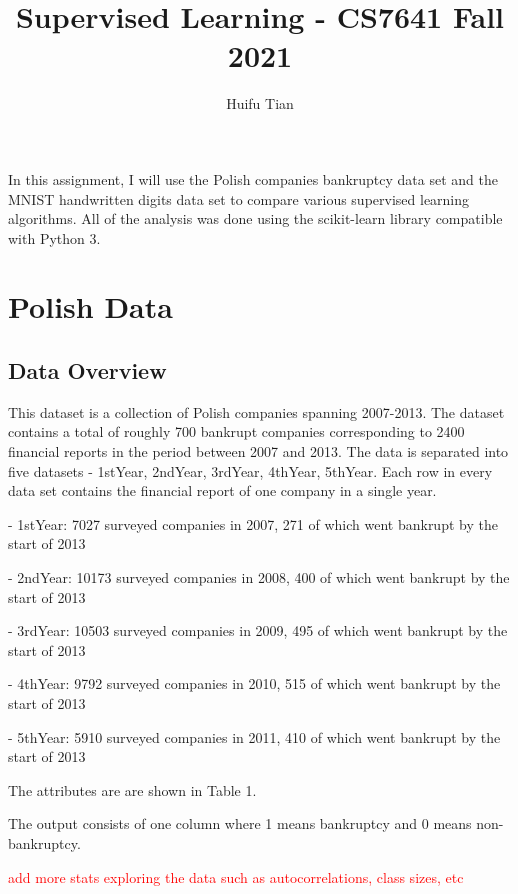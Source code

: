 \documentclass{article}
\title{Supervised Learning - CS7641 Fall 2021}
\author{Huifu Tian}
\newcommand\todo[1]{\textcolor{red}{#1}}
\begin{document}
\maketitle


In this assignment, I will use the Polish companies bankruptcy data set and the MNIST handwritten digits data set to compare various supervised learning algorithms. All of the analysis was done using the scikit-learn library compatible with Python 3.



\section{Polish Data}

\subsection{Data Overview}
This dataset is a collection of Polish companies spanning 2007-2013. The dataset contains a total of roughly 700 bankrupt companies corresponding to 2400 financial reports in the period between 2007 and 2013. The data is separated into five datasets - 1stYear, 2ndYear, 3rdYear, 4thYear, 5thYear. Each row in every data set contains the financial report of one company in a single year. \newline

- 1stYear: 7027 surveyed companies in 2007, 271 of which went bankrupt by the start of 2013

- 2ndYear: 10173 surveyed companies in 2008, 400 of which went bankrupt by the start of 2013

- 3rdYear: 10503 surveyed companies in 2009, 495 of which went bankrupt by the start of 2013

- 4thYear: 9792 surveyed companies in 2010, 515 of which went bankrupt by the start of 2013

- 5thYear: 5910 surveyed companies in 2011, 410 of which went bankrupt by the start of 2013\newline


The attributes are are shown in Table 1. \newline

The output consists of one column where 1 means bankruptcy and 0 means non-bankruptcy. \newline

\todo{add more stats exploring the data such as autocorrelations, class sizes, etc}
\end{document}
